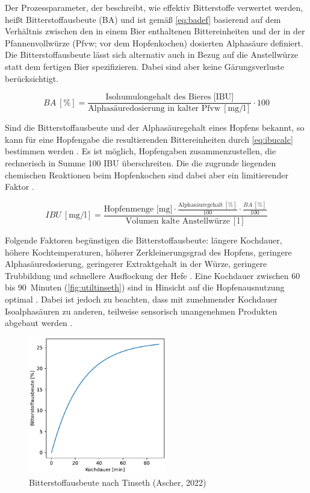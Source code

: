 \documentclass[a4paper,parskip=half]{scrartcl}
\newcommand{\BA}{\mathit{BA}}
\newcommand{\IBU}{\mathit{IBU}}
\newcommand{\uper}{\:[\text{\%}]}
\newcommand{\uli}{\:[\text{l}]}
\newcommand{\ucon}{\:[\text{mg/l}]}
\begin{document}
Der Prozessparameter, der beschreibt, wie effektiv Bitterstoffe verwertet werden, heißt Bitterstoffausbeute (BA) und ist gemäß \autoref{eq:badef} basierend auf dem Verhältnis zwischen den in einem Bier enthaltenen Bittereinheiten und der in der Pfannenvollwürze (Pfvw; vor dem Hopfenkochen) dosierten Alphasäure definiert. Die Bitterstoffausbeute lässt sich alternativ auch in Bezug auf die Anstellwürze statt dem fertigen Bier spezifizieren. Dabei sind aber keine Gärungsverluste berücksichtigt. \parencite[163]{Annemueller2015} 

\begin{equation}
\BA \uper = \frac{\text{Isohumulongehalt des Bieres [IBU]}}{\text{Alphasäuredosierung in kalter Pfvw} \ucon} \cdot 100
\label{eq:badef}
\end{equation}

Sind die Bitterstoffausbeute und der Alphasäuregehalt eines Hopfens bekannt, so kann für eine Hopfengabe die resultierenden Bittereinheiten durch \autoref{eq:ibucalc} bestimmen werden \parencite{Thesseling2019}. Es ist möglich, Hopfengaben zusammenzustellen, die rechnerisch in Summe 100 IBU überschreiten. Die die zugrunde liegenden chemischen Reaktionen beim Hopfenkochen sind dabei aber ein limitierender Faktor \parencite{Deutschman2017}.

\begin{equation}
\IBU \ucon = \frac{\text{Hopfenmenge [mg]} \cdot \frac{\text{Alphasäuregehalt} \uper}{100} \cdot \frac{\BA \uper}{100}}{\text{Volumen kalte Anstellwürze} \uli}
\label{eq:ibucalc}
\end{equation}

Folgende Faktoren begünstigen die Bitterstoffausbeute: längere Kochdauer, höhere Kochtemperaturen, höherer Zerkleinerungsgrad des Hopfens, geringere Alphasäuredosierung, geringerer Extraktgehalt in der Würze, geringere Trubbildung und schnellere Ausflockung der Hefe \parencite{Hosom2017}. Eine Kochdauer zwischen 60 bis 90~Minuten (\autoref{fig:utiltinseth}) sind in Hinsicht auf die Hopfenausnutzung optimal \parencite[5]{Malowicki2005}. Dabei ist jedoch zu beachten, dass mit zunehmender Kochdauer Isoalphasäuren zu anderen, teilweise sensorisch unangenehmen Produkten abgebaut werden \parencite{Kappler2010}.

\begin{figure}[H]
\centering
\includegraphics[width=6cm]{graph_tinseth.pdf}
\caption{Bitterstoffausbeute nach Tinseth (Ascher, 2022)}
\label{fig:utiltinseth}
\end{figure}
\end{document}
